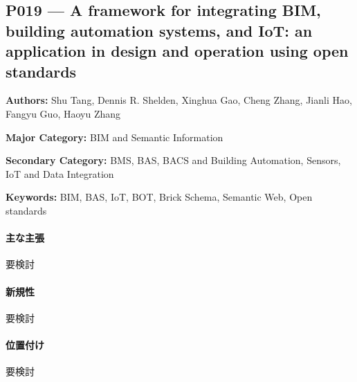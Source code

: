 \subsection{P019 --- A framework for integrating BIM, building automation systems, and IoT: an application in design and operation using open standards}
\label{paper:P019}
\textbf{Authors:} Shu Tang, Dennis R. Shelden, Xinghua Gao, Cheng Zhang, Jianli Hao, Fangyu Guo, Haoyu Zhang\par
\textbf{Major Category:} BIM and Semantic Information\par
\textbf{Secondary Category:} BMS, BAS, BACS and Building Automation, Sensors, IoT and Data Integration\par
\textbf{Keywords:} BIM, BAS, IoT, BOT, Brick Schema, Semantic Web, Open standards\par
\paragraph{主な主張}
要検討 \cite{Tang:2025BIMBASIoT}
\paragraph{新規性}
要検討
\paragraph{位置付け}
要検討
